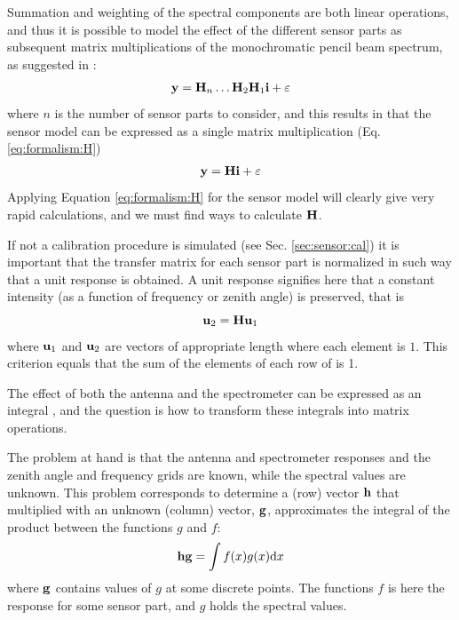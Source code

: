  Summation and weighting of the spectral components are both linear
 operations, and thus it is possible to model the effect of the
 different sensor parts as subsequent matrix multiplications of the
 monochromatic pencil beam spectrum, as suggested in \citet{eriksson:00a}:
 \begin{eqnarray}
   \mathbf{y} = \mathbf{H}_n\dots\mathbf{H}_2\mathbf{H}_1\mathbf{i} + \varepsilon
 \end{eqnarray}
 where $n$ is the number of sensor parts to consider, and this results
 in that the sensor model can be expressed as a single matrix
 multiplication (Eq. \ref{eq:formalism:H})
 \begin{eqnarray}
   \mathbf{y} = \mathbf{H}\mathbf{i} + \varepsilon                     \nonumber
 \end{eqnarray}
 Applying Equation \ref{eq:formalism:H} for the sensor model will
 clearly give very rapid calculations, and we must find ways to
 calculate $\mathbf{H}$.

 \label{sec:sensor:strategy:norm}
 
 If not a calibration procedure is simulated (see Sec.
 \ref{sec:sensor:cal}) it is important that the transfer matrix for
 each sensor part is normalized in such way that a unit response is
 obtained. A unit response signifies here that a constant intensity
 (as a function of frequency or zenith angle) is preserved, that is
 \begin{equation}
   \mathbf{u}_2 = \mathbf{H}\mathbf{u}_1
 \end{equation}
 where $\mathbf{u}_1$ and $\mathbf{u}_2$ are vectors of appropriate length
 where each element is $1$. This criterion equals that the sum of 
 the elements of each row of \Hm is 1.


 \label{sec:sensor:integr}
  
 The effect of both the antenna and the spectrometer can be expressed
 as an integral \citep[e.g.][Eq. 86 and 94]{eriksson:97a}, and the
 question is how to transform these integrals into matrix operations.
  
 The problem at hand is that the antenna and spectrometer responses
 and the zenith angle and frequency grids are known, while the spectral
 values are unknown. This problem corresponds to determine a (row)
 vector $\mathbf{h}$ that multiplied with an unknown (column) vector,
 $\mathbf{g}$, approximates the integral of the product between the
 functions $g$ and $f$:
 \begin{equation} 
   \mathbf{hg} = \int{f(x)g(x) \ensuremath{\mathrm{d}}x}
   \label{eq:sensor:integral_problem}
 \end{equation}
 where $\mathbf{g}$ contains values of $g$ at some discrete points. The
 functions $f$ is here the response for some sensor part, and $g$
 holds the spectral values.
 
